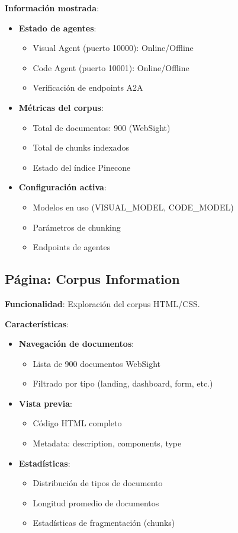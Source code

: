 \documentclass[12pt,a4paper]{article}
\begin{document}
\textbf{Información mostrada}:
\begin{itemize}
    \item \textbf{Estado de agentes}:
    \begin{itemize}
        \item Visual Agent (puerto 10000): Online/Offline
        \item Code Agent (puerto 10001): Online/Offline
        \item Verificación de endpoints A2A
    \end{itemize}
    \item \textbf{Métricas del corpus}:
    \begin{itemize}
        \item Total de documentos: 900 (WebSight)
        \item Total de chunks indexados
        \item Estado del índice Pinecone
    \end{itemize}
    \item \textbf{Configuración activa}:
    \begin{itemize}
        \item Modelos en uso (VISUAL\_MODEL, CODE\_MODEL)
        \item Parámetros de chunking
        \item Endpoints de agentes
    \end{itemize}
\end{itemize}

\subsection{Página: Corpus Information}

\textbf{Funcionalidad}: Exploración del corpus HTML/CSS.

\textbf{Características}:
\begin{itemize}
    \item \textbf{Navegación de documentos}:
    \begin{itemize}
        \item Lista de 900 documentos WebSight
        \item Filtrado por tipo (landing, dashboard, form, etc.)
    \end{itemize}
    \item \textbf{Vista previa}:
    \begin{itemize}
        \item Código HTML completo
        \item Metadata: description, components, type
    \end{itemize}
    \item \textbf{Estadísticas}:
    \begin{itemize}
        \item Distribución de tipos de documento
        \item Longitud promedio de documentos
        \item Estadísticas de fragmentación (chunks)
    \end{itemize}
\end{itemize}
\end{document}
